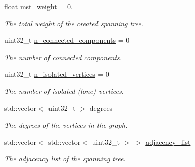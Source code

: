 \begin{DoxyCompactItemize}
\item 
\mbox{\label{structtmap_1_1GraphProperties_a51fa52c1cc9c8d382d507349e99447be}} 
float \hyperlink{structtmap_1_1GraphProperties_a51fa52c1cc9c8d382d507349e99447be}{mst\+\_\+weight} = 0.
\begin{DoxyCompactList}\small\item\em The total weight of the created spanning tree. \end{DoxyCompactList}\item 
\mbox{\label{structtmap_1_1GraphProperties_a3467571c1e645268e55416504809f7c5}} 
uint32\+\_\+t \hyperlink{structtmap_1_1GraphProperties_a3467571c1e645268e55416504809f7c5}{n\+\_\+connected\+\_\+components} = 0
\begin{DoxyCompactList}\small\item\em The number of connected components. \end{DoxyCompactList}\item 
\mbox{\label{structtmap_1_1GraphProperties_a954e8fd087b44b3c568ea07ae2f1efea}} 
uint32\+\_\+t \hyperlink{structtmap_1_1GraphProperties_a954e8fd087b44b3c568ea07ae2f1efea}{n\+\_\+isolated\+\_\+vertices} = 0
\begin{DoxyCompactList}\small\item\em The number of isolated (lone) vertices. \end{DoxyCompactList}\item 
\mbox{\label{structtmap_1_1GraphProperties_af4c85653b3bf56c6dbf19d7a38af40bc}} 
std\+::vector$<$ uint32\+\_\+t $>$ \hyperlink{structtmap_1_1GraphProperties_af4c85653b3bf56c6dbf19d7a38af40bc}{degrees}
\begin{DoxyCompactList}\small\item\em The degrees of the vertices in the graph. \end{DoxyCompactList}\item 
\mbox{\label{structtmap_1_1GraphProperties_a04c11168f810fdaf8b7bfecf96413ba7}} 
std\+::vector$<$ std\+::vector$<$ uint32\+\_\+t $>$ $>$ \hyperlink{structtmap_1_1GraphProperties_a04c11168f810fdaf8b7bfecf96413ba7}{adjacency\+\_\+list}
\begin{DoxyCompactList}\small\item\em The adjacency list of the spanning tree. \end{DoxyCompactList}\end{DoxyCompactItemize}


